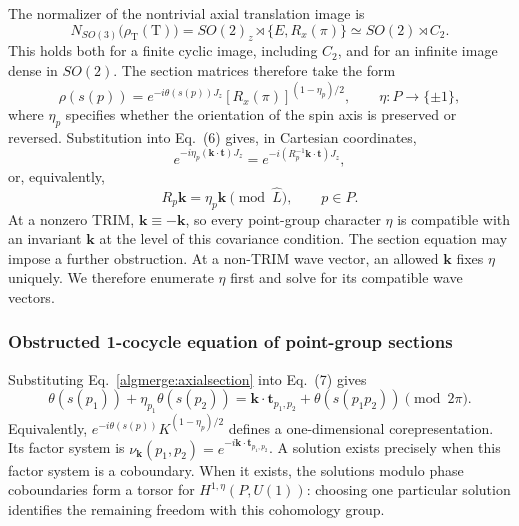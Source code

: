 The normalizer of the nontrivial axial translation image is
\begin{equation}
 N_{SO(3)}\bigl(\rho_{\mathrm T}(\mathrm T)\bigr)
 =SO(2)_z\rtimes\{E,R_x(\pi)\}\simeq SO(2)\rtimes C_2.
 \tag{16}\label{algmerge:axialnormalizer}
\end{equation}
This holds both for a finite cyclic image, including $C_2$, and for
an infinite image dense in $SO(2)$. The section matrices therefore
take the form
\begin{equation}
 \rho(s(p))=e^{-i\theta(s(p))J_z}[R_x(\pi)]^{(1-\eta_p)/2},
 \qquad\eta:P\to\{\pm1\},
 \tag{17}\label{algmerge:axialsection}
\end{equation}
where $\eta_p$ specifies whether the orientation of the spin axis is
preserved or reversed. Substitution into Eq.~(6) gives, in Cartesian
coordinates,
\begin{equation}
 e^{-i\eta_p(\bm k\cdot\bm t)J_z}
 =e^{-i(R_p^{-1}\bm k\cdot\bm t)J_z},
 \tag{18}\label{algmerge:covariancematrix}
\end{equation}
or, equivalently,
\begin{equation}
 R_p\bm k=\eta_p\bm k\pmod{\widehat L},\qquad p\in P.
 \tag{19}\label{algmerge:covariance}
\end{equation}
At a nonzero TRIM, $\bm k\equiv-\bm k$, so every point-group
character $\eta$ is compatible with an invariant $\bm k$ at the
level of this covariance condition. The section equation may impose
a further obstruction. At a non-TRIM wave vector, an allowed
$\bm k$ fixes $\eta$ uniquely. We therefore enumerate $\eta$ first
and solve for its compatible wave vectors.

\subsubsection{Obstructed 1-cocycle equation of point-group sections}

Substituting Eq.~\eqref{algmerge:axialsection} into Eq.~(7) gives
\begin{equation}
 \theta(s(p_1))+\eta_{p_1}\theta(s(p_2))
 =\bm k\cdot\bm t_{p_1,p_2}+\theta(s(p_1p_2))\pmod{2\pi}.
 \tag{20}\label{algmerge:type1cocycle}
\end{equation}
Equivalently, $e^{-i\theta(s(p))}K^{(1-\eta_p)/2}$ defines a
one-dimensional corepresentation. Its factor system is
$\nu_{\bm k}(p_1,p_2)=e^{-i\bm k\cdot\bm t_{p_1,p_2}}$.
A solution exists precisely when this factor system is a coboundary.
When it exists, the solutions modulo phase coboundaries form a torsor
for $H^{1,\eta}(P,U(1))$: choosing one particular solution identifies
the remaining freedom with this cohomology group.

